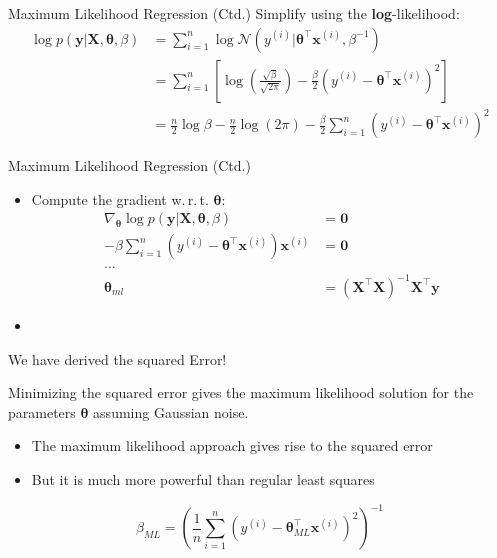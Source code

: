 \begin{frame}{Maximum Likelihood Regression (Ctd.)}{}
	Simplify using the \textbf{log}-likelihood:
	\begin{align}
		\log p(\bm{y} \vert \bm{X}, \bm{\theta}, \beta)
			&= \sum_{i=1}^n \log\mathcal{N}(y^{(i)} \vert \bm{\theta}^{\intercal}\bm{x}^{(i)}, \beta^{-1}) \\
			&= \sum_{i=1}^n \left[ \log\left( \frac{\sqrt{\beta}}{\sqrt{2\pi}} \right) - 
				\frac{\beta}{2}(y^{(i)} - \bm{\theta}^{\intercal}\bm{x}^{(i)})^2 \right] \\
			&= \frac{n}{2} \log\beta - \frac{n}{2}\log(2\pi) - \frac{\beta}{2}\sum_{i=1}^n(y^{(i)} -
				\bm{\theta}^{\intercal}\bm{x}^{(i)})^2
	\end{align}
\end{frame}


\begin{frame}{Maximum Likelihood Regression (Ctd.)}{}
	\begin{itemize}
		\item Compute the gradient w.\,r.\,t. $\bm{\theta}$:
		\begin{align*}
			\nabla_{\bm{\theta}} \log p(\bm{y} \vert \bm{X}, \bm{\theta}, \beta) &= \bm{0} \\
			-\beta \sum_{i=1}^n (y^{(i)} - \bm{\theta}^{\intercal} \bm{x}^{(i)})\bm{x}^{(i)} &= \bm{0} \\
			\dots \\
			\bm{\theta}_{ml} &= (\bm{X}^{\intercal}\bm{X})^{-1} \bm{X}^{\intercal} \bm{y}
		\end{align*}
		\item {}
	\end{itemize}
\end{frame}


\begin{frame}{We have derived the squared Error!}{}\important
	\begin{boxBlue}
		Minimizing the squared error gives the maximum likelihood solution for the parameters $\bm{\theta}$ assuming
		Gaussian noise.
	\end{boxBlue}
	\begin{itemize}
		\item The maximum likelihood approach gives rise to the squared error
		\item But it is much more powerful than regular least squares
	\end{itemize}
	\begin{equation}
		\beta_{ML} = \left( \frac{1}{n} \sum_{i=1}^n
			(y^{(i)} - \bm{\theta}_{ML}^{\intercal} \bm{x}^{(i)})^2 \right)^{-1}
	\end{equation}
\end{frame}


